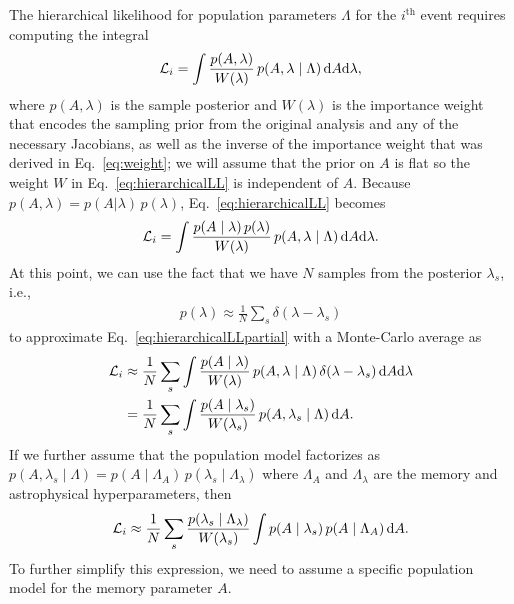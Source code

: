 \documentclass[aps,prd,reprint,twocolumn,10pt,eqsecnum,showpacs,nofootinbib,amsfonts,amssymb,amsmath,longbibliography,superscriptaddress,floatfix]{revtex4-1}
\begin{document}
The hierarchical likelihood for population parameters $\Lambda$ for the $i^{\mathrm{th}}$ event requires computing the integral
\begin{align}
	\label{eq:hierarchicalLL}
	\mathcal{L}_{i}=\int\dfrac{p(A,\lambda)}{W(\lambda)}\, p(A,\lambda \mid \Lambda)\,{\rm d} A {\rm d}\lambda,
\end{align}
where $p(A,\lambda)$ is the sample posterior and $W(\lambda)$ is the importance weight that encodes the sampling prior from the original analysis and any of the necessary Jacobians, as well as the inverse of the importance weight that was derived in Eq.~\eqref{eq:weight}; we will assume that the prior on $A$ is flat so the weight $W$ in Eq.~\eqref{eq:hierarchicalLL} is independent of $A$. Because $p(A,\lambda)=p(A | \lambda)\, p(\lambda)$, Eq.~\eqref{eq:hierarchicalLL} becomes
\begin{align}
	\label{eq:hierarchicalLLpartial}
	\mathcal{L}_{i}=\int \dfrac{p(A \mid \lambda)\, p(\lambda)}{W(\lambda)}\, p(A,\lambda\mid\Lambda)\,{\rm d}A {\rm d}\lambda.
\end{align}
At this point, we can use the fact that we have $N$ samples from the posterior $\lambda_{s}$, i.e.,
\begin{align}
	p(\lambda)\approx\frac{1}{N}\sum\limits_{s}\delta(\lambda-\lambda_{s})
\end{align}
to approximate Eq.~\eqref{eq:hierarchicalLLpartial} with a Monte-Carlo average as
\begin{align}
	\mathcal{L}_{i}&\approx\frac{1}{N}\sum_{s}\int\dfrac{p(A \mid \lambda)}{W(\lambda)}\, p(A,\lambda \mid \Lambda)\, \delta(\lambda-\lambda_{s})\,{\rm d}A {\rm d}\lambda\nonumber\\
	&=\frac{1}{N}\sum_{s}\int\dfrac{p(A \mid \lambda_{s})}{W(\lambda_{s})}\, p(A,\lambda_{s} \mid \Lambda)\, {\rm d}A.
\end{align}
If we further assume that the population model factorizes as $p(A,\lambda_{s} \mid \Lambda)=p(A \mid \Lambda_{A})\, p(\lambda_{s} \mid \Lambda_{\lambda})$ where $\Lambda_{A}$ and $\Lambda_{\lambda}$ are the memory and astrophysical hyperparameters, then
\begin{align}
	\label{eq:hierarchicalLLsimplified}
	\mathcal{L}_{i}\approx\frac{1}{N}\sum\limits_{s}\dfrac{p(\lambda_{s} \mid \Lambda_{\lambda})}{W(\lambda_{s})}\int p(A \mid \lambda_{s})\, p(A \mid \Lambda_{A})\,{\rm d}A.
\end{align}
To further simplify this expression, we need to assume a specific population model for the memory parameter $A$.
\end{document}
